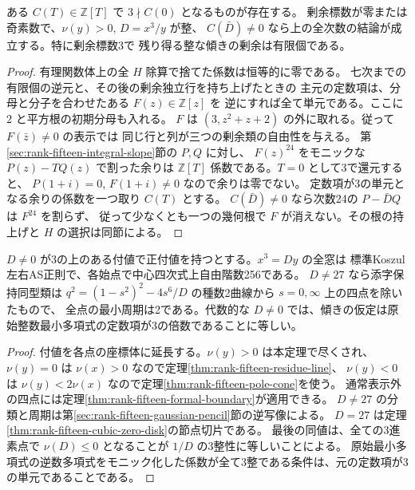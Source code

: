\begin{corollary}\label{cor:rank-fifteen-open-integral-slopes}
ある $C(T)\in\mathbb Z[T]$ で $3\nmid C(0)$ となるものが存在する。
剰余標数が零または奇素数で、$\nu(y)>0$, $D=x^3/y$ が整、
$C(\bar D)\ne0$ なら上の全次数の結論が成立する。特に剰余標数3で
残り得る整な傾きの剰余は有限個である。
\end{corollary}
\begin{proof}
有理関数体上の全 $H$ 除算で捨てた係数は恒等的に零である。
七次までの有限個の逆元と、その後の剰余独立行を持ち上げたときの
主元の定数項は、分母と分子を合わせたある $F(z)\in\mathbb Z[z]$ を
逆にすれば全て単元である。ここに $2$ と平方根の初期分母も入れる。
$F$ は $(3,z^2+z+2)$ の外に取れる。従って $F(\bar z)\ne0$ の表示では
同じ行と列が三つの剰余類の自由性を与える。
第\ref{sec:rank-fifteen-integral-slope}節の $P,Q$ に対し、
$F(z)^{24}$ をモニックな $P(z)-TQ(z)$ で割った余りは
$\mathbb Z[T]$ 係数である。$T=0$ として3で還元すると、
$P(1+i)=0$, $F(1+i)\ne0$ なので余りは零でない。
定数項が3の単元となる余りの係数を一つ取り $C(T)$ とする。
$C(\bar D)\ne0$ なら次数24の $P-\bar DQ$ は $F^{24}$ を割らず、
従って少なくとも一つの幾何根で $F$ が消えない。その根の持上げと
$H$ の選択は同節による。
\end{proof}
\begin{corollary}\label{cor:rank-fifteen-positive-slope}
$D\ne0$ が3の上のある付値で正付値を持つとする。$x^3=Dy$ の全窓は
標準Koszul左右AS正則で、各始点で中心四次式上自由階数256である。
$D\ne27$ なら添字保持同型類は
$q^2=(1-s^2)^2-4s^6/D$ の種数2曲線から $s=0,\infty$ 上の四点を除いたもので、
全点の最小周期は2である。代数的な $D\ne0$ では、傾きの仮定は原始整数最小多項式の定数項が3の倍数であることに等しい。
\end{corollary}
\begin{proof}
付値を各点の座標体に延長する。$\nu(y)>0$ は本定理で尽くされ、
$\nu(y)=0$ は $\nu(x)>0$ なので定理\ref{thm:rank-fifteen-residue-line}、
$\nu(y)<0$ は $\nu(y)<2\nu(x)$ なので定理\ref{thm:rank-fifteen-pole-cone}を使う。
通常表示外の四点には定理\ref{thm:rank-fifteen-formal-boundary}が適用できる。
$D\ne27$ の分類と周期は第\ref{sec:rank-fifteen-gaussian-pencil}節の逆写像による。
$D=27$ は定理\ref{thm:rank-fifteen-cubic-zero-disk}の節点切片である。
最後の同値は、全ての3進素点で $\nu(D)\le0$ となることが $1/D$ の3整性に等しいことによる。
原始最小多項式の逆数多項式をモニック化した係数が全て3整である条件は、元の定数項が3の単元であることである。
\end{proof}
